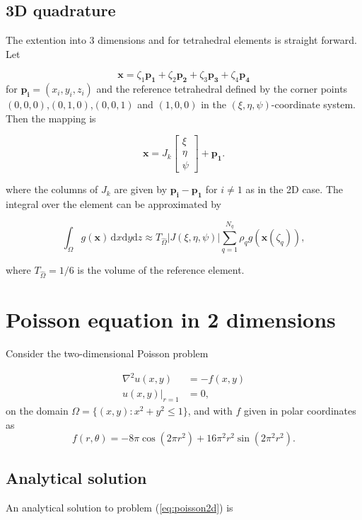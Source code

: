 \documentclass[paper=a4, fontsize=11pt]{scrartcl} %
\begin{document}
\subsection{3D quadrature}
The extention into 3 dimensions and for tetrahedral elements is straight forward. Let

\[ \mathbf{x} = \zeta_1\mathbf{p_1} +\zeta_2\mathbf{p_2} +\zeta_3\mathbf{p_3} + \zeta_4\mathbf{p_4} 
\]
for $\mathbf{p_i} =(x_i,y_i,z_i)$ and the reference tetrahedral defined by the corner points $(0,0,0)$,$(0,1,0)$,$(0,0,1)$ and $(1,0,0)$ in the $(\xi,\eta,\psi)$-coordinate system. Then the mapping is

\[ \mathbf{x}= J_k\left[ \begin{array}{c} \xi\\ \eta\\ \psi \end{array} \right] + \mathbf{p_1}.
\]

where the columns of $J_k$ are given by $\mathbf{p_i}-\mathbf{p_1}$ for $i\neq1$ as in the 2D case. The integral over the element can be approximated by

\[ \int_{\Omega} \! g(\mathbf{x}) \, \mathrm{d}x\mathrm{d}y\mathrm{d}z  \approx T_{\hat{\Omega}} |J(\xi,\eta,\psi)| \sum_{q=1}^{N_q} \rho_{q}g(\mathbf{x}(\zeta_q)),
\]

where $T_{\hat{\Omega}}=1/6$ is the volume of the reference element.

\section{Poisson equation in 2 dimensions}

Consider the two-dimensional Poisson problem

\begin{equation}
\begin{aligned}
\nabla^2u(x,y) 	&= -f(x,y) \\
u(x,y)|_{r=1} 	&= 0,
\end{aligned}
\label{eq:poisson2d}
\end{equation}
on the domain $\Omega = \{(x,y) : x^2+y^2\leq 1\}$, and with $f$ given in polar coordinates as
\[ f(r,\theta)= -8\pi \cos(2\pi r^2)+16\pi^2r^2\sin(2\pi^2 r^2).\]

\subsection{Analytical solution}
An analytical solution to problem (\ref{eq:poisson2d}) is 
\end{document}
